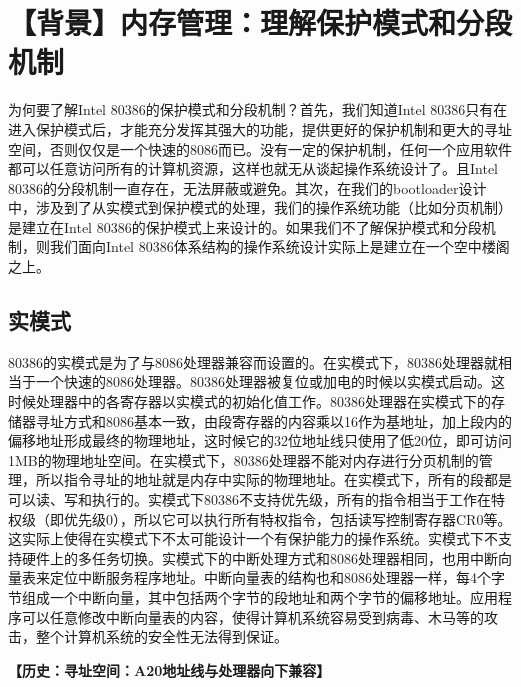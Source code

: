 \section{【背景】内存管理：理解保护模式和分段机制}\label{ux80ccux666fux5185ux5b58ux7ba1ux7406ux7406ux89e3ux4fddux62a4ux6a21ux5f0fux548cux5206ux6bb5ux673aux5236}

为何要了解Intel 80386的保护模式和分段机制？首先，我们知道Intel
80386只有在进入保护模式后，才能充分发挥其强大的功能，提供更好的保护机制和更大的寻址空间，否则仅仅是一个快速的8086而已。没有一定的保护机制，任何一个应用软件都可以任意访问所有的计算机资源，这样也就无从谈起操作系统设计了。且Intel
80386的分段机制一直存在，无法屏蔽或避免。其次，在我们的bootloader设计中，涉及到了从实模式到保护模式的处理，我们的操作系统功能（比如分页机制）是建立在Intel
80386的保护模式上来设计的。如果我们不了解保护模式和分段机制，则我们面向Intel
80386体系结构的操作系统设计实际上是建立在一个空中楼阁之上。

\subsection{实模式}\label{ux5b9eux6a21ux5f0f}

80386的实模式是为了与8086处理器兼容而设置的。在实模式下，80386处理器就相当于一个快速的8086处理器。80386处理器被复位或加电的时候以实模式启动。这时候处理器中的各寄存器以实模式的初始化值工作。80386处理器在实模式下的存储器寻址方式和8086基本一致，由段寄存器的内容乘以16作为基地址，加上段内的偏移地址形成最终的物理地址，这时候它的32位地址线只使用了低20位，即可访问1MB的物理地址空间。在实模式下，80386处理器不能对内存进行分页机制的管理，所以指令寻址的地址就是内存中实际的物理地址。在实模式下，所有的段都是可以读、写和执行的。实模式下80386不支持优先级，所有的指令相当于工作在特权级（即优先级0），所以它可以执行所有特权指令，包括读写控制寄存器CR0等。这实际上使得在实模式下不太可能设计一个有保护能力的操作系统。实模式下不支持硬件上的多任务切换。实模式下的中断处理方式和8086处理器相同，也用中断向量表来定位中断服务程序地址。中断向量表的结构也和8086处理器一样，每4个字节组成一个中断向量，其中包括两个字节的段地址和两个字节的偏移地址。应用程序可以任意修改中断向量表的内容，使得计算机系统容易受到病毒、木马等的攻击，整个计算机系统的安全性无法得到保证。

\textbf{【历史：寻址空间：A20地址线与处理器向下兼容】}

